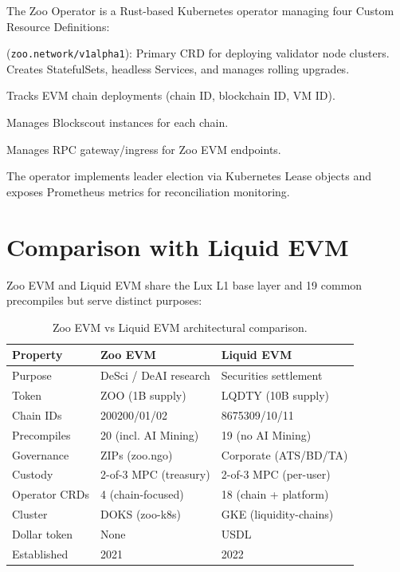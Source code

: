 \documentclass[11pt,a4paper]{article}
\begin{document}
The Zoo Operator is a Rust-based Kubernetes operator managing four Custom Resource Definitions:

\begin{description}[nosep]
  \item[ZooNetwork] (\texttt{zoo.network/v1alpha1}): Primary CRD for deploying validator node clusters. Creates StatefulSets, headless Services, and manages rolling upgrades.
  \item[ZooChain] Tracks EVM chain deployments (chain ID, blockchain ID, VM ID).
  \item[ZooExplorer] Manages Blockscout instances for each chain.
  \item[ZooGateway] Manages RPC gateway/ingress for Zoo EVM endpoints.
\end{description}

The operator implements leader election via Kubernetes Lease objects and exposes Prometheus metrics for reconciliation monitoring.

\section{Comparison with Liquid EVM}

Zoo EVM and Liquid EVM share the Lux L1 base layer and 19 common precompiles but serve distinct purposes:

\begin{table}[h]
\centering
\small
\begin{tabular}{lll}
\toprule
\textbf{Property} & \textbf{Zoo EVM} & \textbf{Liquid EVM} \\
\midrule
Purpose & DeSci / DeAI research & Securities settlement \\
Token & ZOO (1B supply) & LQDTY (10B supply) \\
Chain IDs & 200200/01/02 & 8675309/10/11 \\
Precompiles & 20 (incl. AI Mining) & 19 (no AI Mining) \\
Governance & ZIPs (zoo.ngo) & Corporate (ATS/BD/TA) \\
Custody & 2-of-3 MPC (treasury) & 2-of-3 MPC (per-user) \\
Operator CRDs & 4 (chain-focused) & 18 (chain + platform) \\
Cluster & DOKS (zoo-k8s) & GKE (liquidity-chains) \\
Dollar token & None & USDL \\
Established & 2021 & 2022 \\
\bottomrule
\end{tabular}
\caption{Zoo EVM vs Liquid EVM architectural comparison.}
\end{table}
\end{document}
